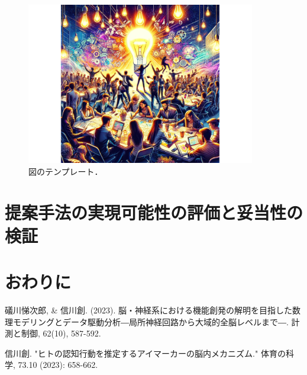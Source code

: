 \documentclass[uplatex,dvipdfmx]{jsarticle}
\begin{document}
\begin{figure}[h]
\centering
 \centering
\includegraphics[width=10cm]{./Figs/idea.pdf}
\caption{図のテンプレート．}
\label{fig:problem}
\end{figure}


\section{提案手法の実現可能性の評価と妥当性の検証}
%

\section{おわりに}




\begin{thebibliography}{9}
 礒川悌次郎, \& 信川創. (2023). 脳・神経系における機能創発の解明を目指した数理モデリングとデータ駆動分析―局所神経回路から大域的全脳レベルまで―. 計測と制御, 62(10), 587-592.

  信川創. "ヒトの認知行動を推定するアイマーカーの脳内メカニズム." 体育の科学, 73.10 (2023): 658-662.
\end{thebibliography}
\end{document}
